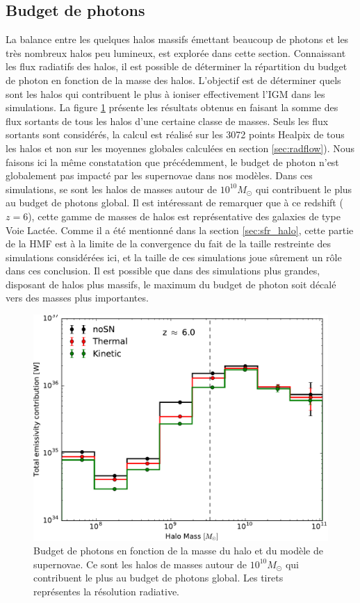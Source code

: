 \subsection{Budget de photons}
\label{sec:photonbudget}
La balance entre les quelques halos massifs émettant beaucoup de photons et les très nombreux halos peu lumineux, est explorée dans cette section.
Connaissant les flux radiatifs des halos, il est possible de déterminer la répartition du budget de photon en fonction de la masse des halos.
L'objectif est de déterminer quels sont les halos qui contribuent le plus à ioniser effectivement l'\ac{IGM} dans les simulations.
La figure \ref{fig:budget} présente les résultats obtenus en faisant la somme des flux sortants de tous les halos d'une certaine classe de masses.
Seuls les flux sortants sont considérés, la calcul est réalisé sur les 3072 points Healpix de tous les halos et non sur les moyennes globales calculées en section \ref{sec:radflow}).
Nous faisons ici la même constatation que précédemment, le budget de photon n'est globalement pas impacté par les supernovae dans nos modèles.
Dans ces simulations, se sont les halos de masses autour de $10^{10} M_\odot$ qui contribuent le plus au budget de photons global.
Il est intéressant de remarquer que à ce redshift ($z=6$), cette gamme de masses de halos est représentative des galaxies de type Voie Lactée.
Comme il a été mentionné dans la section \ref{sec:sfr_halo}, cette partie de la \ac{HMF} est à la limite de la convergence du fait de la taille restreinte des simulations considérées ici, et la taille de ces simulations joue sûrement un rôle dans ces conclusion.
Il est possible que dans des simulations plus grandes, disposant de halos plus massifs, le maximum du budget de photon soit décalé vers des masses plus importantes.

\begin{figure}
	\centering
	\includegraphics[width=.95\linewidth]{img/03/totout.pdf} 
    \caption[Budget de photon]{Budget de photons en fonction de la masse du halo et du modèle de supernovae. 
    Ce sont les halos de masses autour de $10^{10} M_\odot$ qui contribuent le plus au budget de photons global.
    Les tirets représentes la résolution radiative.
 	\label{fig:budget}}
\end{figure}

